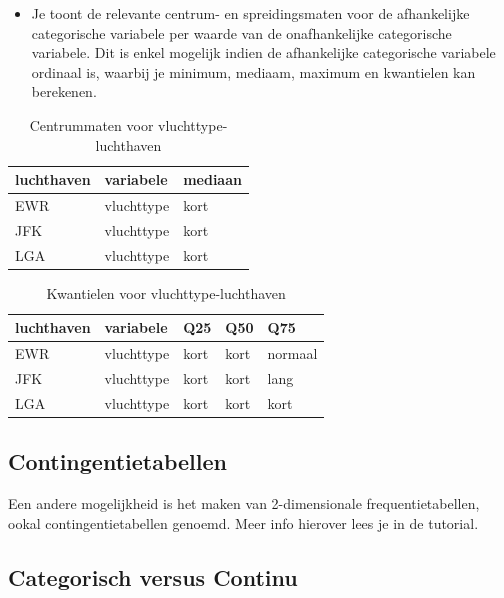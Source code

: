 \documentclass[]{tufte-book}
\providecommand{\tightlist}{%
  \setlength{\itemsep}{0pt}\setlength{\parskip}{0pt}}
\begin{document}
\begin{itemize}
\tightlist
\item
  Je toont de relevante centrum- en spreidingsmaten voor de afhankelijke categorische variabele per waarde van de onafhankelijke categorische variabele. Dit is enkel mogelijk indien de afhankelijke categorische variabele ordinaal is, waarbij je minimum, mediaam, maximum en kwantielen kan berekenen.
\end{itemize}

\begin{table}

\caption{\label{tab:unnamed-chunk-71}Centrummaten voor vluchttype-luchthaven}
\centering
\fontsize{10}{12}\selectfont
\begin{tabular}[t]{lll}
\toprule
luchthaven & variabele & mediaan\\
\midrule
EWR & vluchttype & kort\\
JFK & vluchttype & kort\\
LGA & vluchttype & kort\\
\bottomrule
\end{tabular}
\end{table}

\begin{table}

\caption{\label{tab:unnamed-chunk-72}Kwantielen voor vluchttype-luchthaven}
\centering
\fontsize{10}{12}\selectfont
\begin{tabular}[t]{lllll}
\toprule
luchthaven & variabele & Q25 & Q50 & Q75\\
\midrule
EWR & vluchttype & kort & kort & normaal\\
JFK & vluchttype & kort & kort & lang\\
LGA & vluchttype & kort & kort & kort\\
\bottomrule
\end{tabular}
\end{table}

\hypertarget{contingentietabellen}{%
\subsection*{Contingentietabellen}\label{contingentietabellen}}

Een andere mogelijkheid is het maken van 2-dimensionale frequentietabellen, ookal contingentietabellen genoemd. Meer info hierover lees je in de tutorial.

\hypertarget{categorisch-versus-continu}{%
\subsection{Categorisch versus Continu}\label{categorisch-versus-continu}}
\end{document}
